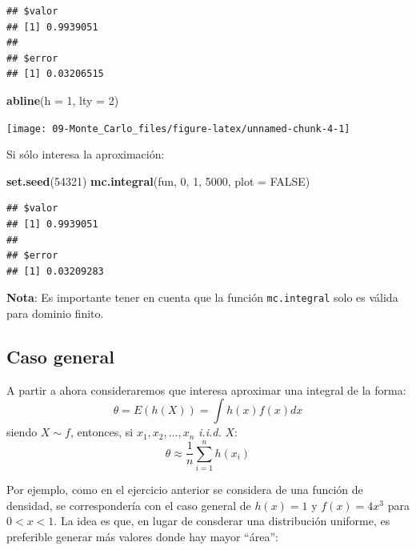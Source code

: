 \documentclass[]{book}
\newenvironment{Shaded}{\begin{snugshade}}{\end{snugshade}}
\newcommand{\KeywordTok}[1]{\textcolor[rgb]{0.13,0.29,0.53}{\textbf{#1}}}
\newcommand{\DataTypeTok}[1]{\textcolor[rgb]{0.13,0.29,0.53}{#1}}
\newcommand{\DecValTok}[1]{\textcolor[rgb]{0.00,0.00,0.81}{#1}}
\newcommand{\OtherTok}[1]{\textcolor[rgb]{0.56,0.35,0.01}{#1}}
\newcommand{\NormalTok}[1]{#1}
\theoremstyle{definition}
\theoremstyle{definition}
\theoremstyle{definition}
\theoremstyle{remark}
\begin{document}
\begin{verbatim}
## $valor
## [1] 0.9939051
## 
## $error
## [1] 0.03206515
\end{verbatim}

\begin{Shaded}
\begin{Highlighting}[]
\KeywordTok{abline}\NormalTok{(}\DataTypeTok{h =} \DecValTok{1}\NormalTok{, }\DataTypeTok{lty =} \DecValTok{2}\NormalTok{)}
\end{Highlighting}
\end{Shaded}

\begin{center}\texttt{[image: 09-Monte\_Carlo\_files/figure-latex/unnamed-chunk-4-1]} \end{center}

Si sólo interesa la aproximación:

\begin{Shaded}
\begin{Highlighting}[]
\KeywordTok{set.seed}\NormalTok{(}\DecValTok{54321}\NormalTok{)}
\KeywordTok{mc.integral}\NormalTok{(fun, }\DecValTok{0}\NormalTok{, }\DecValTok{1}\NormalTok{, }\DecValTok{5000}\NormalTok{, }\DataTypeTok{plot =} \OtherTok{FALSE}\NormalTok{)}
\end{Highlighting}
\end{Shaded}

\begin{verbatim}
## $valor
## [1] 0.9939051
## 
## $error
## [1] 0.03209283
\end{verbatim}

\textbf{Nota}: Es importante tener en cuenta que la función
\texttt{mc.integral} solo es válida para dominio finito.

\subsection{Caso general}\label{caso-general}

A partir a ahora consideraremos que interesa aproximar una integral de
la forma:
\[\theta = E\left( h\left( X\right) \right) = \int h\left( x\right) f(x)dx\]siendo
\(X\sim f\), entonces, si \(x_{1},x_{2},\ldots ,x_{n}\) \emph{i.i.d.}
\(X\):
\[\theta \approx \frac{1}{n}\sum\limits_{i=1}^{n}h\left( x_{i}\right)\]

Por ejemplo, como en el ejercicio anterior se considera de una función
de densidad, se correspondería con el caso general de \(h(x) = 1\) y
\(f(x) = 4x^3\) para \(0<x<1\). La idea es que, en lugar de consderar
una distribución uniforme, es preferible generar más valores donde hay
mayor ``área'':
\end{document}
